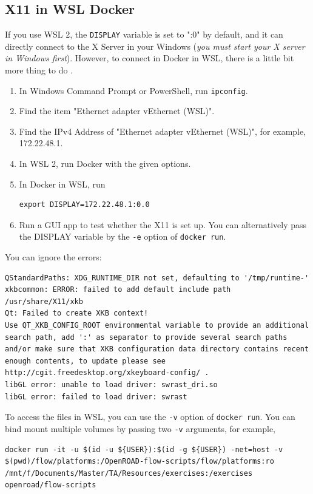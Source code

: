 \documentclass[a4paper,12pt,twoside]{article}
\begin{document}
\subsection{X11 in WSL Docker}
If you use WSL 2, the \texttt{DISPLAY} variable is set to ":0" by default, and it can directly connect to the X Server in your Windows (\textit{you must start your X server in Windows first}). However, to connect in Docker in WSL, there is a little bit more thing to do \cite{wsldockerx11}.
\begin{enumerate}
    \item In Windows Command Prompt or PowerShell, run \texttt{ipconfig}.
    \item Find the item "Ethernet adapter vEthernet (WSL)".
    \item Find the IPv4 Address of "Ethernet adapter vEthernet (WSL)", for example, 172.22.48.1.
    \item In WSL 2, run Docker with the given options.
    \item In Docker in WSL, run
    \begin{verbatim}
export DISPLAY=172.22.48.1:0.0
    \end{verbatim}
    \item Run a GUI app to test whether the X11 is set up. You can alternatively pass the DISPLAY variable by the \texttt{-e} option of \texttt{docker run}.
\end{enumerate}
You can ignore the errors:
\begin{verbatim}
QStandardPaths: XDG_RUNTIME_DIR not set, defaulting to '/tmp/runtime-'
xkbcommon: ERROR: failed to add default include path /usr/share/X11/xkb
Qt: Failed to create XKB context!
Use QT_XKB_CONFIG_ROOT environmental variable to provide an additional search path, add ':' as separator to provide several search paths and/or make sure that XKB configuration data directory contains recent enough contents, to update please see http://cgit.freedesktop.org/xkeyboard-config/ .
libGL error: unable to load driver: swrast_dri.so
libGL error: failed to load driver: swrast
\end{verbatim}
To access the files in WSL, you can use the \texttt{-v} option of \texttt{docker run}. You can bind mount multiple volumes by passing two \texttt{-v} arguments, for example,
\begin{verbatim}
docker run -it -u $(id -u ${USER}):$(id -g ${USER}) -net=host -v $(pwd)/flow/platforms:/OpenROAD-flow-scripts/flow/platforms:ro /mnt/f/Documents/Master/TA/Resources/exercises:/exercises openroad/flow-scripts
\end{verbatim}
\end{document}
